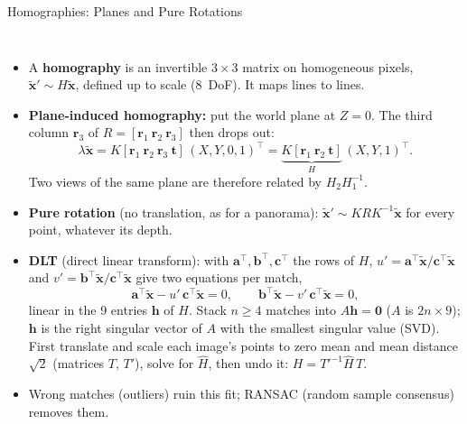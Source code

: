 \begin{frame}{Homographies: Planes and Pure Rotations}
  \begin{columns}[T,onlytextwidth]
      \begin{itemize}\scriptsize\itemsep0.15em
        \item A \textbf{homography} is an invertible $3\times3$ matrix on homogeneous pixels, $\tilde{\mathbf{x}}'\sim H\tilde{\mathbf{x}}$, defined up to scale (8~DoF). It maps lines to lines.
        \item \textbf{Plane-induced homography:} put the world plane at $Z=0$. The third column $\mathbf{r}_3$ of $R=[\mathbf{r}_1\ \mathbf{r}_2\ \mathbf{r}_3]$ then drops out:
        \[ \lambda\tilde{\mathbf{x}} = K[\mathbf{r}_1\ \mathbf{r}_2\ \mathbf{r}_3\ \mathbf{t}]\,(X,Y,0,1)^\top = \underbrace{K[\mathbf{r}_1\ \mathbf{r}_2\ \mathbf{t}]}_{H}\,(X,Y,1)^\top. \]
        Two views of the same plane are therefore related by $H_2H_1^{-1}$.
        \item \textbf{Pure rotation} (no translation, as for a panorama): $\tilde{\mathbf{x}}'\sim KRK^{-1}\tilde{\mathbf{x}}$ for every point, whatever its depth.
        \item \textbf{DLT} (direct linear transform): with $\mathbf{a}^\top,\mathbf{b}^\top,\mathbf{c}^\top$ the rows of $H$, $u'=\mathbf{a}^\top\tilde{\mathbf{x}}/\mathbf{c}^\top\tilde{\mathbf{x}}$ and $v'=\mathbf{b}^\top\tilde{\mathbf{x}}/\mathbf{c}^\top\tilde{\mathbf{x}}$ give two equations per match,
        \[ \mathbf{a}^\top\tilde{\mathbf{x}}-u'\,\mathbf{c}^\top\tilde{\mathbf{x}}=0,\qquad \mathbf{b}^\top\tilde{\mathbf{x}}-v'\,\mathbf{c}^\top\tilde{\mathbf{x}}=0, \]
        linear in the 9 entries $\mathbf{h}$ of $H$. Stack $n\geq4$ matches into $A\mathbf{h}=\mathbf{0}$ ($A$ is $2n\times9$); $\mathbf{h}$ is the right singular vector of $A$ with the smallest singular value (SVD). First translate and scale each image's points to zero mean and mean distance $\sqrt{2}$ (matrices $T$, $T'$), solve for $\hat{H}$, then undo it: $H=T'^{-1}\hat{H}\,T$.
        \item Wrong matches (outliers) ruin this fit; RANSAC (random sample consensus) removes them.
      \end{itemize}
      \centering
      \vspace{0.8em}
      \begin{tikzpicture}[font=\sffamily\scriptsize, >=latex, scale=1.12, every node/.style={transform shape}, gridln/.style={blue!55!black, thin}]

\end{tikzpicture}
\end{columns}
\end{frame}
